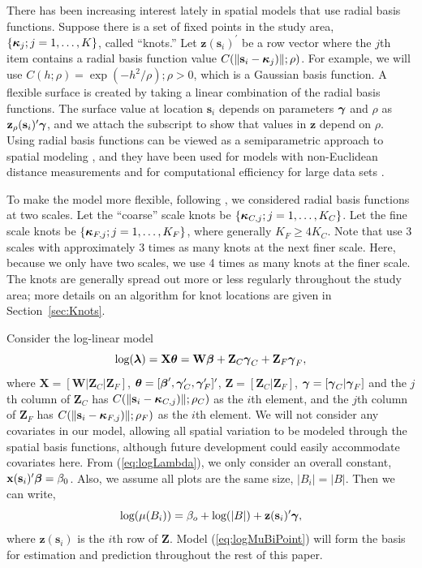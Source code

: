 \documentclass[12pt, titlepage]{article}\usepackage[]{graphicx}\usepackage[]{color}
\newcommand{\bx}{\ensuremath{\mathbf{x}}}
\newcommand{\bz}{\ensuremath{\mathbf{z}}}
\newcommand{\bs}{\ensuremath{\mathbf{s}}}
\def\bs{\mathbf{s}}
\def\bz{\mathbf{z}}
\def\bW{\mathbf{W}}
\def\bX{\mathbf{X}}
\def\bZ{\mathbf{Z}}
\def\bbeta{\mbox{\boldmath $\beta$}}
\def\bgamma{\mbox{\boldmath $\gamma$}}
\def\bkappa{\mbox{\boldmath $\kappa$}}
\def\blambda{\mbox{\boldmath $\lambda$}}
\def\btheta{\mbox{\boldmath $\theta$}}
\def\log{\textrm{log}}
\def\upp{^{\prime}}
\begin{document}
There has been increasing interest lately in spatial models that use radial basis functions. Suppose there is a set of fixed points in the study area, $\{\bkappa_j;j=1,\ldots,K\}$, called ``knots.'' Let $\bz(\bs_i)\upp$ be a row vector where the $j$th item contains a radial basis function value $C(\| \bs_i-\bkappa_j)\|;\rho)$. For example, we will use $C(h;\rho)=\exp(-h^2/\rho); \rho > 0$, which is a Gaussian basis function. A flexible surface is created by taking a linear combination of the radial basis functions. The surface value at location $\bs_i$ depends on parameters $\bgamma$ and $\rho$ as $\bz_\rho(\bs_i)\upp\bgamma$, and we attach the subscript to show that values in $\bz$ depend on $\rho$.  Using radial basis functions can be viewed as a semiparametric approach to spatial modeling \citep*{Rupp:Wand:Carr:semi:2003}, and they have been used for models with non-Euclidean distance measurements \citep*[see, e.g.,][]{Wang:Rana:low:2007} and for computational efficiency for large data sets \citep*{Cres:Gard:fixe:2008}. 

To make the model more flexible, following \citet{Cres:Gard:fixe:2008}, we considered radial basis functions at two scales.  Let the ``coarse'' scale knots be $\{\bkappa_{C,j};j=1,\ldots,K_C\}$.  Let the fine scale knots be $\{\bkappa_{F,j};j=1,\ldots,K_F\}$, where generally $K_F \geq 4K_C$. Note that \citet{Cres:Gard:fixe:2008} use 3 scales with approximately 3 times as many knots at the next finer scale. Here, because we only have two scales, we use 4 times as many knots at the finer scale.  The knots are generally spread out more or less regularly throughout the study area; more details on an algorithm for knot locations are given in Section~\ref{sec:Knots}.

Consider the log-linear model
\begin{equation}\label{eq:mixmod}
 \log(\blambda) = \bX\btheta = \bW\bbeta + \bZ_C\bgamma_C + \bZ_F\bgamma_F,
\end{equation}
where $\bX = [\bW|\bZ_C|\bZ_F]$, $\btheta = [\bbeta^{\prime},\bgamma_C^{\prime},\bgamma_F^{\prime}]^{\prime}$, $\bZ = [\bZ_C|\bZ_F]$, $\bgamma = [\bgamma_C|\bgamma_F]$ and the $j$th column of $\bZ_C$ has $C(\| \bs_i-\bkappa_{C,j})\|;\rho_C)$ as the $i$th element,  and the $j$th column of $\bZ_F$ has $C(\| \bs_i-\bkappa_{F,j})\|;\rho_F)$ as the $i$th element. We will not consider any covariates in our model, allowing all spatial variation to be modeled through the spatial basis functions, although future development could easily accommodate covariates here. From (\ref{eq:logLambda}), we only consider an overall constant, $\bx(\bs_i)^\prime\bbeta = \beta_0$.  Also, we assume all plots are the same size, $|{B_i}| = |B|$.  Then we can  write,
\begin{equation}\label{eq:logMuBiPoint}
	\log(\mu(B_i)) = \beta_o + \log(|B|) + \bz(\bs_i)^\prime\bgamma,
\end{equation}
where $\bz(\bs_i)$ is the $i$th row of $\bZ$. Model (\ref{eq:logMuBiPoint}) will form the basis for estimation and prediction throughout the rest of this paper.
\end{document}
